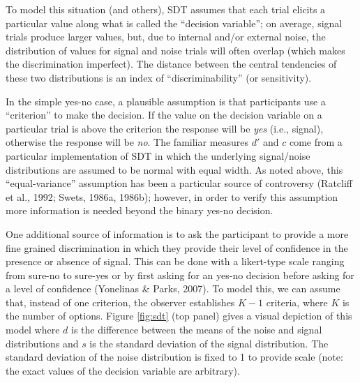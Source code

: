 \documentclass[
  english,
  ,man,floatsintext]{apa6}
\begin{document}
To model this situation (and others), SDT assumes that each trial elicits a particular value along what is called the \enquote{decision variable}; on average, signal trials produce larger values, but, due to internal and/or external noise, the distribution of values for signal and noise trials will often overlap (which makes the discrimination imperfect). The distance between the central tendencies of these two distributions is an index of \enquote{discriminability} (or sensitivity).

In the simple yes-no case, a plausible assumption is that participants use a \enquote{criterion} to make the decision. If the value on the decision variable on a particular trial is above the criterion the response will be \emph{yes} (i.e., signal), otherwise the response will be \emph{no}. The familiar measures \(d'\) and \(c\) come from a particular implementation of SDT in which the underlying signal/noise distributions are assumed to be normal with equal width. As noted above, this \enquote{equal-variance} assumption has been a particular source of controversy (Ratcliff et al., 1992; Swets, 1986a, 1986b); however, in order to verify this assumption more information is needed beyond the binary yes-no decision.

One additional source of information is to ask the participant to provide a more fine grained discrimination in which they provide their level of confidence in the presence or absence of signal. This can be done with a likert-type scale ranging from sure-no to sure-yes or by first asking for an yes-no decision before asking for a level of confidence (Yonelinas \& Parks, 2007). To model this, we can assume that, instead of one criterion, the observer establishes \(K - 1\) criteria, where \(K\) is the number of options. Figure \ref{fig:sdt} (top panel) gives a visual depiction of this model where \(d\) is the difference between the means of the noise and signal distributions and \(s\) is the standard deviation of the signal distribution. The standard deviation of the noise distribution is fixed to 1 to provide scale (note: the exact values of the decision variable are arbitrary).
\end{document}
